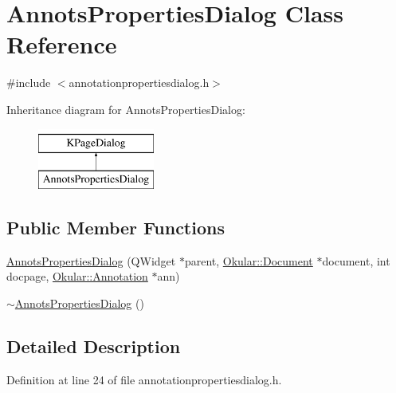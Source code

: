 \hypertarget{classAnnotsPropertiesDialog}{\section{Annots\+Properties\+Dialog Class Reference}
\label{classAnnotsPropertiesDialog}
}


{\ttfamily \#include $<$annotationpropertiesdialog.\+h$>$}

Inheritance diagram for Annots\+Properties\+Dialog\+:\begin{figure}[H]
\begin{center}
\leavevmode
\includegraphics[height=2.000000cm]{classAnnotsPropertiesDialog}
\end{center}
\end{figure}
\subsection*{Public Member Functions}
\begin{DoxyCompactItemize}
\item 
\hyperlink{classAnnotsPropertiesDialog_aad41d7b667dca056fa7a15bd3dc170a4}{Annots\+Properties\+Dialog} (Q\+Widget $\ast$parent, \hyperlink{classOkular_1_1Document}{Okular\+::\+Document} $\ast$document, int docpage, \hyperlink{classOkular_1_1Annotation}{Okular\+::\+Annotation} $\ast$ann)
\item 
\hyperlink{classAnnotsPropertiesDialog_a6e793792141e6b628b224f9c0b70dd09}{$\sim$\+Annots\+Properties\+Dialog} ()
\end{DoxyCompactItemize}


\subsection{Detailed Description}


Definition at line 24 of file annotationpropertiesdialog.\+h.




